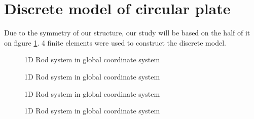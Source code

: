 \section*{Discrete model of circular plate}
Due to the symmetry of our structure, our study will be based on the half of
it on figure \ref{fig:halfModel}. 4 finite elements were used to construct the discrete
model.
\begin{figure}[H]
    \centering
        
    \caption{1D Rod system in global coordinate system}\label{fig:halfModel}      
\end{figure}
\begin{figure}[H]
    \centering
        
    \caption{1D Rod system in global coordinate system}\label{fig:localDispl}      
\end{figure}
\begin{figure}[H]
    \centering
        
    \caption{1D Rod system in global coordinate system}\label{fig:globDispl}      
\end{figure}
\begin{figure}[H]
    \centering
        
    \caption{1D Rod system in global coordinate system}\label{fig:coords}      
\end{figure}